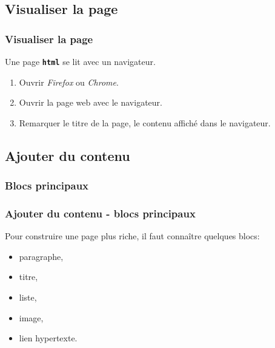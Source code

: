 \documentclass[svgnames,11pt]{beamer}
\begin{document}
\subsection{Visualiser la page}
\begin{frame}
    \frametitle{Visualiser la page}

    Une page \textbf{\texttt{html}} se lit avec un navigateur.

    \begin{activite}
        \begin{enumerate}
            \item Ouvrir \emph{Firefox} ou \emph{Chrome}.
            \item Ouvrir la page web avec le navigateur.
            \item Remarquer le titre de la page, le contenu affiché dans le navigateur.
        \end{enumerate}
    \end{activite}
\end{frame}
\subsection{Ajouter du contenu}
\subsubsection{Blocs principaux}
\begin{frame}
    \frametitle{Ajouter du contenu - blocs principaux}
    Pour construire une page plus riche, il faut connaître quelques blocs:
    \begin{itemize}
        \item paragraphe,
        \item titre,
        \item liste,
        \item image,
        \item lien hypertexte.
    \end{itemize}


\end{frame}
\end{document}
